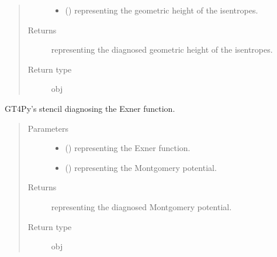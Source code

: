 \documentclass[letterpaper,10pt,english]{sphinxmanual}
\begin{document}
\begin{fulllineitems}
\begin{fulllineitems}
\begin{quote}
\begin{description}
\begin{itemize}
\item {} 
 () \textendash{}  representing the geometric height of the isentropes.

\end{itemize}

\item[{Returns}] \leavevmode
{} representing the diagnosed geometric height of the isentropes.

\item[{Return type}] \leavevmode
obj

\end{description}\end{quote}

\end{fulllineitems}


\begin{fulllineitems}
\label{\detokenize{api:dycore.diagnostic_isentropic.DiagnosticIsentropic._defs_stencil_diagnosing_montgomery}}
GT4Py’s stencil diagnosing the Exner function.
\begin{quote}\begin{description}
\item[{Parameters}] \leavevmode\begin{itemize}
\item {} 
 () \textendash{}  representing the Exner function.

\item {} 
 () \textendash{}  representing the Montgomery potential.

\end{itemize}

\item[{Returns}] \leavevmode
{} representing the diagnosed Montgomery potential.

\item[{Return type}] \leavevmode
obj

\end{description}\end{quote}


\end{fulllineitems}
\end{fulllineitems}
\end{document}
